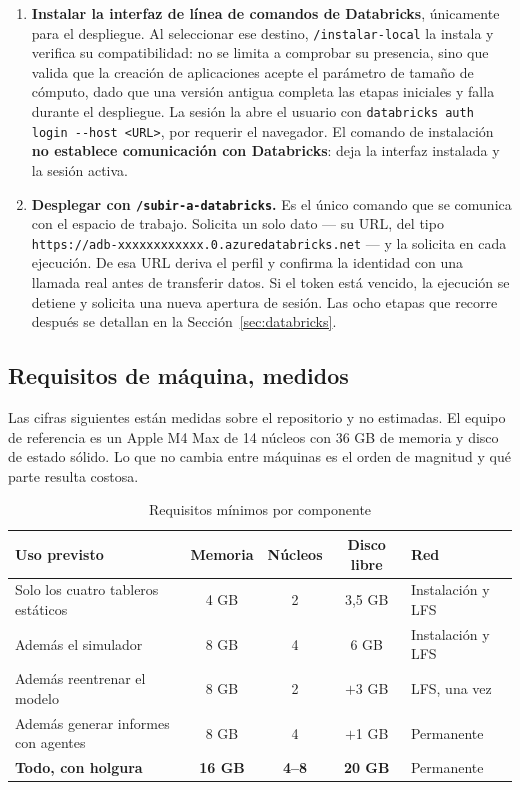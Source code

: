 \documentclass[11pt,a4paper]{article}
\begin{document}
\begin{enumerate}
  \item \textbf{Instalar la interfaz de línea de comandos de Databricks}, únicamente para el
        despliegue. Al seleccionar ese destino, \texttt{/instalar-local} la instala y verifica
        su compatibilidad: no se limita a comprobar su presencia, sino que valida que la
        creación de aplicaciones acepte el parámetro de tamaño de cómputo, dado que una versión
        antigua completa las etapas iniciales y falla durante el despliegue. La sesión la abre
        el usuario con \texttt{databricks auth login -{}-host <URL>}, por requerir el navegador.
        El comando de instalación \textbf{no establece comunicación con Databricks}: deja la
        interfaz instalada y la sesión activa.

  \item \textbf{Desplegar con \texttt{/subir-a-databricks}.} Es el único comando que se comunica
        con el espacio de trabajo. Solicita un solo dato --- su URL, del tipo
        \texttt{https://adb-\allowbreak xxxxxxxxxxxx.\allowbreak 0.azuredatabricks.net} --- y la solicita en cada
        ejecución. De esa URL deriva el perfil y confirma la identidad con una llamada real
        antes de transferir datos. Si el token está vencido, la ejecución se detiene y solicita
        una nueva apertura de sesión. Las ocho etapas que recorre después se detallan en la
        Sección~\ref{sec:databricks}.
\end{enumerate}

\subsection{Requisitos de máquina, medidos}

Las cifras siguientes están medidas sobre el repositorio y no estimadas. El equipo de
referencia es un Apple M4 Max de 14 núcleos con 36 GB de memoria y disco de estado sólido. Lo
que no cambia entre máquinas es el orden de magnitud y qué parte resulta costosa.

\begin{table}[H]
\centering
\caption{Requisitos mínimos por componente}
\label{tab:requisitos}
\small
\begin{tabularx}{\textwidth}{X c c c L{2.6cm}}
\toprule
\textbf{Uso previsto} & \textbf{Memoria} & \textbf{Núcleos} & \textbf{Disco libre} & \textbf{Red} \\
\midrule
Solo los cuatro tableros estáticos & 4 GB & 2 & 3,5 GB & Instalación y LFS \\
Además el simulador & 8 GB & 4 & 6 GB & Instalación y LFS \\
Además reentrenar el modelo & 8 GB & 2 & $+$3 GB & LFS, una vez \\
Además generar informes con agentes & 8 GB & 4 & $+$1 GB & Permanente \\
\midrule
\textbf{Todo, con holgura} & \textbf{16 GB} & \textbf{4--8} & \textbf{20 GB} & Permanente \\
\bottomrule
\end{tabularx}
\end{table}
\end{document}

